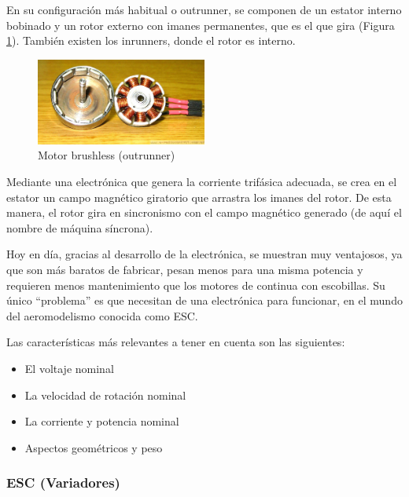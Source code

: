 \documentclass[12pt,twoside]{article}
\begin{document}
\begin{itemize}
	En su configuración más habitual o outrunner, se componen de un estator interno 	bobinado y un rotor externo con imanes permanentes, que es el que gira (Figura \ref{fig:motor_brushless}). También 	existen los inrunners, donde el rotor es interno.

			\begin{figure}
			\centering
			\includegraphics[width=0.5\textwidth]{Imatges/Funcionament/motor_brushless.png}
			\caption{Motor brushless (outrunner)}
			\label{fig:motor_brushless}
		\end{figure}
	
Mediante una electrónica que genera la corriente trifásica adecuada, se crea en el 	estator un campo magnético giratorio que arrastra los imanes del rotor. De esta 	manera, el rotor gira en sincronismo con el campo magnético generado (de aquí el 	nombre de máquina síncrona).

	Hoy en día, gracias al desarrollo de la electrónica, se muestran muy ventajosos, ya que 	son más baratos de fabricar, pesan menos para una misma potencia y requieren 	menos mantenimiento que los 	motores de continua con escobillas. Su único 	“problema” es que necesitan de una electrónica para funcionar, en el mundo del 	aeromodelismo conocida como ESC.
	
	Las características más relevantes a tener en cuenta son las siguientes:
		\begin{itemize}

			\item El voltaje nominal
			\item La velocidad de rotación nominal
			\item La corriente y potencia nominal
			\item Aspectos geométricos y peso
		\end{itemize}
	

		\end{itemize}
		
			\subsubsection{ESC (Variadores)}\label{subsubsec:ESC}
			
\end{document}
